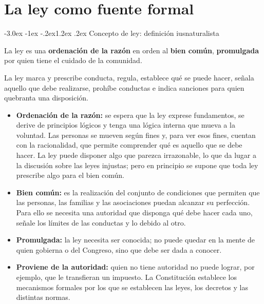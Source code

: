 \documentclass[12pt,oneside]{book}
\makeatletter
\renewcommand\section{\@startsection{section}{1}{\z@}%
  {-3.0ex \@plus -1ex \@minus -.2ex}{1.2ex \@plus .2ex}%
  {\normalfont\large\bfseries\color{acento}}}
\makeatother
\begin{document}

\chapter{La ley como fuente formal}
\section{Concepto de ley: definición iusnaturalista}

\begin{definicion}
La ley es una \textbf{ordenación de la razón} en orden al \textbf{bien común}, \textbf{promulgada} por quien tiene el cuidado de la comunidad.
\end{definicion}

La ley marca y prescribe conducta, regula, establece qué se puede hacer, señala aquello que debe realizarse, prohíbe conductas e indica sanciones para quien quebranta una disposición.

\begin{itemize}
    \item \textbf{Ordenación de la razón:} se espera que la ley exprese fundamentos, se derive de principios lógicos y tenga una lógica interna que mueva a la voluntad. Las personas se mueven según fines y, para ver esos fines, cuentan con la racionalidad, que permite comprender qué es aquello que se debe hacer. La ley puede disponer algo que parezca irrazonable, lo que da lugar a la discusión sobre las leyes injustas; pero en principio se supone que toda ley prescribe algo para el bien común.
    \item \textbf{Bien común:} es la realización del conjunto de condiciones que permiten que las personas, las familias y las asociaciones puedan alcanzar su perfección. Para ello se necesita una autoridad que disponga qué debe hacer cada uno, señale los límites de las conductas y lo debido al otro.
    \item \textbf{Promulgada:} la ley necesita ser conocida; no puede quedar en la mente de quien gobierna o del Congreso, sino que debe ser dada a conocer.
    \item \textbf{Proviene de la autoridad:} quien no tiene autoridad no puede lograr, por ejemplo, que le transfieran un impuesto. La Constitución establece los mecanismos formales por los que se establecen las leyes, los decretos y las distintas normas.
\end{itemize}
\end{document}
